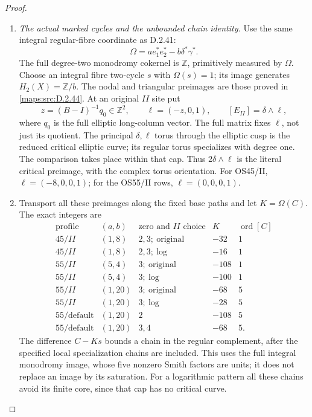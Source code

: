 \begin{proof}
\begin{enumerate}[label=\arabic*.,leftmargin=*]
\item \emph{The actual marked cycles and the unbounded chain identity.}
Use the same integral regular-fibre coordinate as D.2.41:
\[
                \Omega=a e_1^*e_2^*-b\delta^*\gamma^*.
                                                               \tag{D45.16}\label{maps:eq:D45.16}
\]
The full degree-two monodromy cokernel is $\mathbb Z$,
primitively measured by $\Omega$. Choose an integral
fibre two-cycle $s$ with $\Omega(s)=1$; its image generates
$H_2(X)=\mathbb Z/b$. The nodal and triangular preimages
are those proved in \ref{maps:src:D.2.44}. At an original $II$ site put
\[
 z=(B-I)^{-1}q_0\in\mathbb Z^2,\qquad
 \ell=(-z,0,1),\qquad [E_{II}]=\delta\wedge\ell,             \tag{D45.17}\label{maps:eq:D45.17}
\]
where $q_0$ is the full elliptic long-column vector.
The full matrix fixes $\ell$, not just its quotient.
The principal $\delta,\ell$ torus through the elliptic
cusp is the reduced critical elliptic curve; its regular
torus specializes with degree one. The comparison takes
place within that cap. Thus $2\delta\wedge\ell$ is the
literal critical preimage, with the complex torus orientation.
For OS45/II, $\ell=(-8,0,0,1)$; for the OS55/II rows,
$\ell=(0,0,0,1)$.

\item Transport all these preimages along the fixed base paths
and let $K=\Omega(C)$. The exact integers are
\[
\begin{array}{c|c|c|r|c}
 \text{profile}&(a,b)&\text{zero and }II\text{ choice}&K&
                                  \operatorname{ord}[C]\\\hline
 45/II&(1,8)&2,3;\ \mathrm{original}&-32&1\\
 45/II&(1,8)&2,3;\ \mathrm{log}&-16&1\\
 55/II&(5,4)&3;\ \mathrm{original}&-108&1\\
 55/II&(5,4)&3;\ \mathrm{log}&-100&1\\
 55/II&(1,20)&3;\ \mathrm{original}&-68&5\\
 55/II&(1,20)&3;\ \mathrm{log}&-28&5\\
 55/\mathrm{default}&(1,20)&2&-108&5\\
 55/\mathrm{default}&(1,20)&3,4&-68&5.
\end{array}                                                    \tag{D45.18}\label{maps:eq:D45.18}
\]
The difference $C-Ks$ bounds a chain in the regular
complement, after the specified local specialization
chains are included. This uses the full integral
monodromy image, whose five nonzero Smith factors are
units; it does not replace an image by its saturation.
For a logarithmic pattern all these chains avoid its
finite core, since that cap has no critical curve.


\end{enumerate}
\end{proof}
